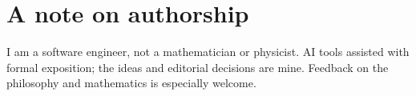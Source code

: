 \documentclass[12pt]{article}
\theoremstyle{remark}
\begin{document}

\section*{A note on authorship}

I am a software engineer, not a mathematician or physicist.  AI tools
assisted with formal exposition; the ideas and editorial decisions are
mine.  Feedback on the philosophy and mathematics is especially welcome.













\end{document}
